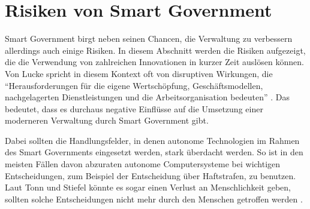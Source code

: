 \section{Risiken von Smart Government}
Smart Government birgt neben seinen Chancen, die Verwaltung zu verbessern allerdings auch einige Risiken.
In diesem Abschnitt werden die Risiken aufgezeigt, die die Verwendung von zahlreichen Innovationen in kurzer Zeit auslösen können.
Von Lucke spricht in diesem Kontext oft von disruptiven Wirkungen, die ``Herausforderungen für die eigene Wertschöpfung, Geschäftsmodellen, nachgelagerten Dienstleistungen und die Arbeitsorganisation bedeuten'' \citep[][S.172	]{von_Lucke_2016}.
Das bedeutet, dass es durchaus negative Einflüsse auf die Umsetzung einer moderneren Verwaltung durch Smart Government gibt. 
\par
Dabei sollten die Handlungsfelder, in denen autonome Technologien im Rahmen des Smart Governments eingesetzt werden, stark überdacht werden.
So ist in den meisten Fällen davon abzuraten autonome Computersysteme bei wichtigen Entscheidungen, zum Beispiel der Entscheidung über Haftstrafen, zu benutzen.
Laut Tonn und Stiefel könnte es sogar einen Verlust an Menschlichkeit geben, sollten solche Entscheidungen nicht mehr durch den Menschen getroffen werden \citep[Vgl.][S. 322]{Tonn2012}.


